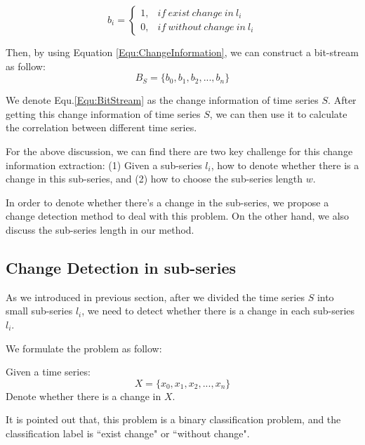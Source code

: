\begin{equation}
\label{Equ:ChangeInformation}
b_i = \left\{\begin{matrix}
1, & if~exist~change~in~l_i
\\ 
0, & if~without~change~in~l_i
\end{matrix}\right.
\end{equation}

Then, by using Equation \ref{Equ:ChangeInformation}, we can construct a bit-stream as follow:
\begin{equation}
\label{Equ:BitStream}
B_S = \{b_0,b_1,b_2,...,b_n\}
\end{equation}

We denote Equ.\ref{Equ:BitStream} as the change information of time series $S$. After getting this change information of time series $S$, we can then use it to calculate the correlation between different time series.

For the above discussion, we can find there are two key challenge for this change information extraction: (1) Given a sub-series $l_i$, how to denote whether there is a change in this sub-series, and (2) how to choose the sub-series length $w$.

In order to denote whether there's a change in the sub-series, we propose a change detection method to deal with this problem. On the other hand, we also discuss the sub-series length in our method.

\subsection{Change Detection in sub-series}
\label{sec:changeDetect}

As we introduced in previous section, after we divided the time series $S$ into small sub-series $l_i$, we need to detect whether there is a change in each sub-series $l_i$.

We formulate the problem as follow:

\begin{definition}
Given a time series:
\[X = \{x_0,x_1,x_2,...,x_n\}\]
Denote whether there is a change in $X$.
\end{definition}
It is pointed out that, this problem is a binary classification problem, and the classification label is ``exist change" or ``without change".

